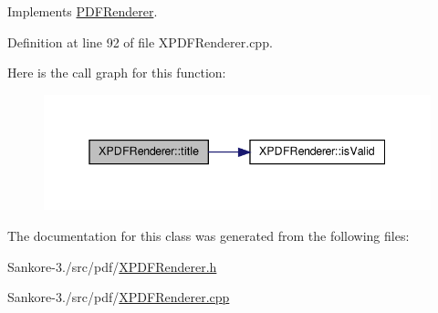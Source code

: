 Implements \hyperlink{class_p_d_f_renderer_a9e455189ab34238ccc84f42db288ca70}{P\-D\-F\-Renderer}.



Definition at line 92 of file X\-P\-D\-F\-Renderer.\-cpp.



Here is the call graph for this function\-:
\nopagebreak
\begin{figure}[H]
\begin{center}
\leavevmode
\includegraphics[width=342pt]{df/d96/class_x_p_d_f_renderer_a5ea5a7a04304ab8018a7b4918f37bebd_cgraph}
\end{center}
\end{figure}




The documentation for this class was generated from the following files\-:\begin{DoxyCompactItemize}
\item 
Sankore-\/3./src/pdf/\hyperlink{_x_p_d_f_renderer_8h}{X\-P\-D\-F\-Renderer.\-h}\item 
Sankore-\/3./src/pdf/\hyperlink{_x_p_d_f_renderer_8cpp}{X\-P\-D\-F\-Renderer.\-cpp}\end{DoxyCompactItemize}
